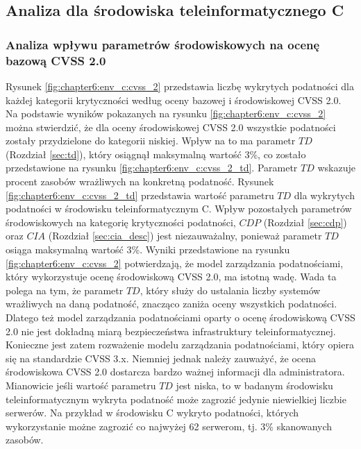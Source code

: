 
\subsection{Analiza dla środowiska teleinformatycznego C}



\subsubsection{Analiza wpływu parametrów środowiskowych na ocenę bazową CVSS 2.0}
Rysunek \ref{fig:chapter6:env_c:cvss_2} przedstawia liczbę wykrytych podatności dla każdej kategorii krytyczności według oceny bazowej i środowiskowej CVSS 2.0. Na podstawie wyników pokazanych na rysunku \ref{fig:chapter6:env_c:cvss_2} można stwierdzić, że dla oceny środowiskowej CVSS 2.0 wszystkie podatności zostały przydzielone do kategorii niskiej. Wpływ na to ma parametr $TD$ (Rozdział \ref{sec:td}), który osiągnął maksymalną wartość 3\%, co zostało przedstawione na rysunku \ref{fig:chapter6:env_c:cvss_2_td}. Parametr $TD$ wskazuje procent zasobów wrażliwych na konkretną podatność. Rysunek \ref{fig:chapter6:env_c:cvss_2_td} przedstawia wartość parametru $TD$ dla wykrytych podatności w środowisku teleinformatycznym C. Wpływ pozostałych parametrów środowiskowych na kategorię krytyczności podatności, $CDP$ (Rozdział \ref{sec:cdp}) oraz $CIA$ (Rozdział \ref{sec:cia_desc}) jest niezauważalny, ponieważ parametr $TD$ osiąga maksymalną wartość 3\%. Wyniki przedstawione na rysunku \ref{fig:chapter6:env_c:cvss_2} potwierdzają, że model zarządzania podatnościami, który wykorzystuje ocenę środowiskową CVSS 2.0, ma istotną wadę. Wada ta polega na tym, że parametr $TD$, który służy do ustalania liczby systemów wrażliwych na daną podatność, znacząco zaniża oceny wszystkich podatności. Dlatego też model zarządzania podatnościami oparty o ocenę środowiskową CVSS 2.0 nie jest dokładną miarą bezpieczeństwa infrastruktury teleinformatycznej. Konieczne jest zatem rozważenie modelu zarządzania podatnościami, który opiera się na standardzie CVSS 3.x. Niemniej jednak należy zauważyć, że ocena środowiskowa CVSS 2.0 dostarcza bardzo ważnej informacji dla administratora. Mianowicie jeśli wartość parametru $TD$ jest niska, to w badanym środowisku teleinformatycznym wykryta podatność może zagrozić jedynie niewielkiej liczbie serwerów. Na przykład w środowisku C wykryto podatności, których wykorzystanie możne zagrozić co najwyżej 62 serwerom, tj. 3\% skanowanych zasobów.

